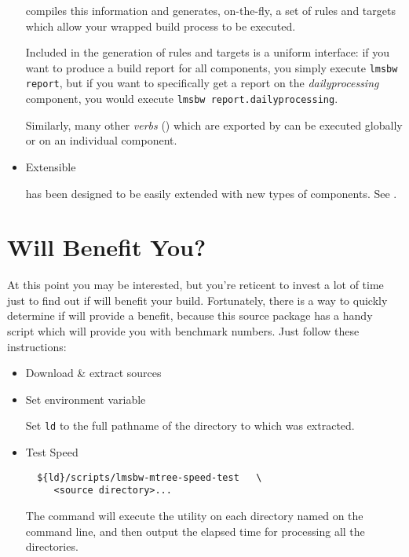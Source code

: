 \begin{itemize}
  \lmsbw compiles this information and generates, on-the-fly, a set of
  \make rules and targets which allow your wrapped build process to be
  executed.

  Included in the generation of rules and targets is a uniform
  interface: if you want to produce a build report for all components,
  you simply execute \texttt{lmsbw report}, but if you want to
  specifically get a report on the \emph{dailyprocessing} component,
  you would execute \texttt{lmsbw report.dailyprocessing}.

  Similarly, many other \emph{verbs} () which
  are exported by \lmsbw can be executed globally or on an individual
  component.

\item Extensible

  \lmsbw has been designed to be easily extended with new types of
  components.  See .
\end{itemize}

\section{Will \lmsbw Benefit You?}

At this point you may be interested, but you're reticent to invest a
lot of time just to find out if \lmsbw will benefit your build.
Fortunately, there is a way to quickly determine if \lmsbw will
provide a benefit, because this source package has a handy script
which will provide you with benchmark numbers.  Just follow these
instructions:

\begin{itemize}
\item Download \& extract \lmsbw sources

\item Set environment variable

  Set \texttt{ld} to the full pathname of the directory to which
  \lmsbw was extracted.

\item Test Speed

\begin{verbatim}
  ${ld}/scripts/lmsbw-mtree-speed-test   \
     <source directory>...
\end{verbatim}

  The command will execute the \mtree utility on each directory named
  on the command line, and then output the elapsed time for processing
  all the directories.

\end{itemize}


